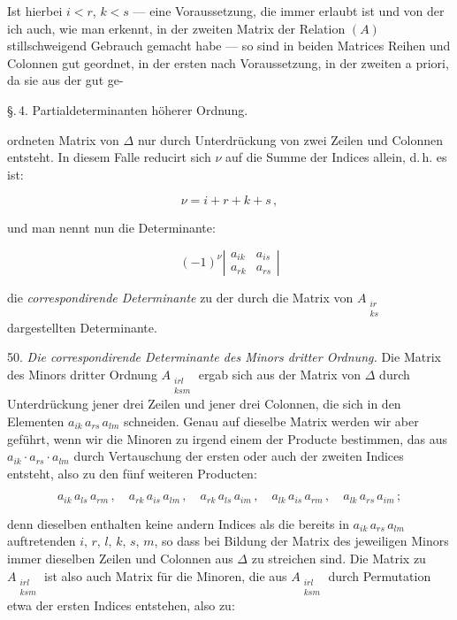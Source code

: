 \documentclass[11pt]{article}
\providecommand{\weberpage}[1]{}
\begin{document}
Ist hierbei $i<r$, $k<s$ --- eine Voraussetzung, die immer erlaubt ist und von der ich auch, wie
man erkennt, in der zweiten Matrix der Relation $(A)$ stillschweigend Gebrauch gemacht habe ---
so sind in beiden Matrices Reihen und Colonnen gut geordnet, in der ersten nach Voraussetzung, in
der zweiten a priori, da sie aus der gut ge-


\weberpage{55}
\S.\,4. Partialdeterminanten h\"oherer Ordnung.

ordneten Matrix von $\varDelta$ nur durch Unterdr\"uckung von zwei Zeilen und Colonnen entsteht.
In diesem Falle reducirt sich $\nu$ auf die Summe der Indices allein, d.\,h. es ist:

\[
\nu = i+r+k+s\,,
\]

und man nennt nun die Determinante:

\[
(-1)^\nu \left|\begin{array}{cc} a_{ik} & a_{is} \\ a_{rk} & a_{rs} \end{array}\right|
\]

die \textit{correspondirende Determinante} zu der durch die Matrix von $A_{\substack{ir\\ks}}$
dargestellten Determinante.

50. \textit{Die correspondirende Determinante des Minors dritter Ordnung.} Die Matrix des Minors
dritter Ordnung $A_{\substack{irl\\ksm}}$ ergab sich aus der Matrix von $\varDelta$ durch
Unterdr\"uckung jener drei Zeilen und jener drei Colonnen, die sich in den Elementen $a_{ik}\,
a_{rs}\,a_{lm}$ schneiden. Genau auf dieselbe Matrix werden wir aber gef\"uhrt, wenn wir die
Minoren zu irgend einem der Producte bestimmen, das aus $a_{ik}\cdot a_{rs}\cdot a_{lm}$ durch
Vertauschung der ersten oder auch der zweiten Indices entsteht, also zu den f\"unf weiteren
Producten:

\[
a_{ik}\,a_{ls}\,a_{rm}\,,\quad a_{rk}\,a_{is}\,a_{lm}\,,\quad a_{rk}\,a_{ls}\,a_{im}\,,\quad
a_{lk}\,a_{is}\,a_{rm}\,,\quad a_{lk}\,a_{rs}\,a_{im}\,;
\]

denn dieselben enthalten keine andern Indices als die bereits in $a_{ik}\,a_{rs}\,a_{lm}$
auftretenden $i,\,r,\,l,\,k,\,s,\,m$, so dass bei Bildung der Matrix des jeweiligen Minors immer
dieselben Zeilen und Colonnen aus $\varDelta$ zu streichen sind. Die Matrix zu
$A_{\substack{irl\\ksm}}$ ist also auch Matrix f\"ur die Minoren, die aus $A_{\substack{irl\\ksm}}$
durch Permutation etwa der ersten Indices entstehen, also zu:
\end{document}
